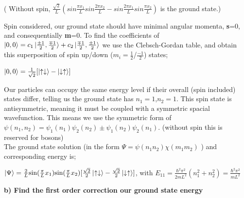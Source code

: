 \documentclass{journal}
\begin{document}
\begin{center}
\small
  ( Without spin, $\frac{\sqrt2}{L}(sin\frac{\pi x_1}{L}sin\frac{2\pi x_2}{L}-sin\frac{2\pi x_1}{L}sin\frac{\pi x_2}{L})$ is the ground state.)\\
\end{center}

Spin considered, our ground state should have minimal angular momenta, \textbf{s}=0, and consequentially \textbf{m}=0. To find the coefficients of $\ket{0,0}=c_1\ket{\frac{\pm1}{2},\frac{\mp1}{2}}+c_2\ket{\frac{\mp1}{2},\frac{\pm1}{2}}$ we use the Clebsch-Gordan table, and obtain this superposition of spin up/down ($m_{i}=\frac12$/$\frac{-1}2$) states;
\begin{center}
$\ket{0,0}=\frac{1}{\sqrt{2}}[\ket{\uparrow\downarrow}-\ket{\downarrow\uparrow}]$\\
\end{center}
Our particles can occupy the same energy level if their overall (spin included) states differ, telling us the ground state has $n_1=1$,$n_2=1$. This spin state is antisymmetric, meaning it must be coupled with a symmetric spacial wavefunction. This means we use the symmetric form of $\psi(n_1,n_2)=\psi_1(n_1)\psi_2(n_2)\pm\psi_1(n_2)\psi_2(n_1)$. (without spin this is reserved for bosons)\\

The ground state solution (in the form $\Psi=\psi(n_1n_2)\chi(m_1m_2)$ ) and corresponding energy is;\\
\begin{center}
\large
$\ket{\Psi}=\frac{2}{L}\text{sin}(\frac{\pi}{L}x_1)\text{sin}(\frac{\pi}{L}x_2)[\frac{\sqrt{2}}2\ket{\uparrow\downarrow}-\frac{\sqrt{2}}2\ket{\downarrow\uparrow}]$, with $E_{11}=\frac{\hbar^2\pi^2}{2mL^2}(n_1^2+n_2^2)=\frac{\hbar^2\pi^2}{mL^2}$\\
\end{center}
\pagebreak
\textbf{b) Find the first order correction our ground state energy}\\
\end{document}
